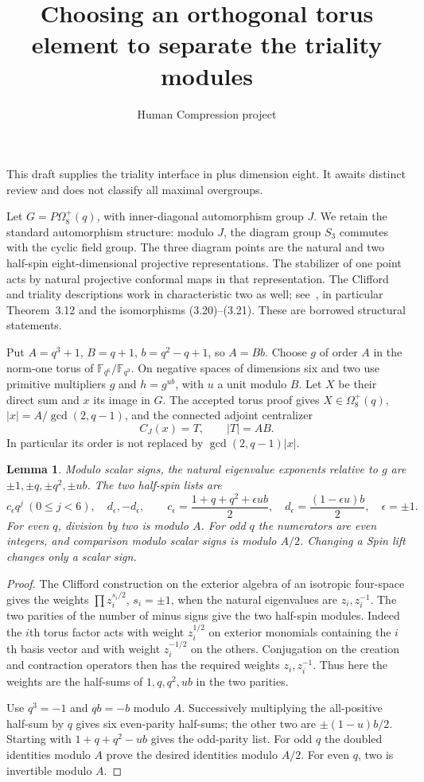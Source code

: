 \documentclass[11pt,a4paper]{article}
\title{Choosing an orthogonal torus element to separate the triality modules}
\author{Human Compression project}\date{}
\newtheorem{lemma}{Lemma}
\newcommand{\F}{\mathbb F}
\newcommand{\Om}{\Omega}
\begin{document}
\maketitle
This draft supplies the triality interface in plus dimension eight.
It awaits distinct review and does not classify all maximal overgroups.

Let $G=P\Om_8^+(q)$, with inner-diagonal automorphism group $J$.
We retain the standard automorphism structure: modulo $J$, the diagram
group $S_3$ commutes with the cyclic field group. The three diagram points
are the natural and two half-spin eight-dimensional projective
representations. The stabilizer of one point acts by natural projective
conformal maps in that representation. The Clifford and triality
descriptions work in characteristic two as well; see~\cite[Sections~3.1
and~3.4]{BT}, in particular Theorem~3.12 and the isomorphisms
(3.20)--(3.21). These are borrowed structural statements.

Put $A=q^3+1$, $B=q+1$, $b=q^2-q+1$, so $A=Bb$.
Choose $g$ of order $A$ in the norm-one torus of
$\F_{q^6}/\F_{q^3}$. On negative spaces of dimensions six and two use
primitive multipliers $g$ and $h=g^{ub}$, with $u$ a unit modulo $B$.
Let $X$ be their direct sum and $x$ its image in $G$.
The accepted torus proof gives $X\in\Om_8^+(q)$,
$|x|=A/\gcd(2,q-1)$, and the connected adjoint centralizer
\[
                      C_J(x)=T,\qquad |T|=AB.                 \tag{1}
\]
In particular its order is not replaced by $\gcd(2,q-1)|x|$.

\begin{lemma}\label{weights}
Modulo scalar signs, the natural eigenvalue exponents relative to $g$
are $\pm1,\pm q,\pm q^2,\pm ub$. The two half-spin lists are
\[
 c_\epsilon q^j\ (0\le j<6),\quad d_\epsilon,-d_\epsilon,\qquad
 c_\epsilon=\frac{1+q+q^2+\epsilon ub}{2},\quad
 d_\epsilon=\frac{(1-\epsilon u)b}{2},\quad\epsilon=\pm1.       \tag{2}
\]
For even $q$, division by two is modulo $A$. For odd $q$ the numerators
are even integers, and comparison modulo scalar signs is modulo $A/2$.
Changing a Spin lift changes only a scalar sign.
\end{lemma}
\begin{proof}
The Clifford construction on the exterior algebra of an isotropic
four-space gives the weights $\prod z_i^{s_i/2}$, $s_i=\pm1$, when the
natural eigenvalues are $z_i,z_i^{-1}$. The two parities of the number
of minus signs give the two half-spin modules. Indeed the $i$th torus
factor acts with weight $z_i^{1/2}$ on exterior monomials containing
the $i$th basis vector and with weight $z_i^{-1/2}$ on the others.
Conjugation on the creation and contraction operators then has the
required weights $z_i,z_i^{-1}$. Thus here the weights are the
half-sums of $1,q,q^2,ub$ in the two parities.

Use $q^3=-1$ and $qb=-b$ modulo $A$. Successively multiplying the
all-positive half-sum by $q$ gives six even-parity half-sums;
the other two are $\pm(1-u)b/2$. Starting with
$1+q+q^2-ub$ gives the odd-parity list. For odd $q$ the doubled
identities modulo $A$ prove the desired identities modulo $A/2$.
For even $q$, two is invertible modulo $A$.
\end{proof}
\end{document}
